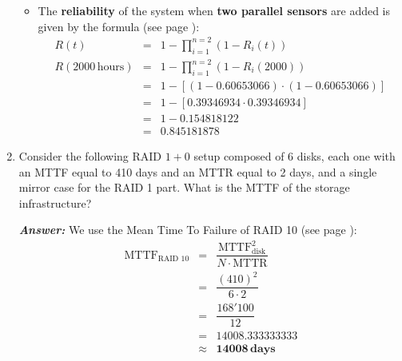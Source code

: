 \begin{enumerate}
\begin{itemize}
        \item The \textbf{reliability} of the system when \textbf{two parallel sensors} are added is given by the formula (see page \pageref{eq: system fails when the last component fails - parallel}):
        \begin{equation*}
            \begin{array}{rcl}
                R\left(t\right) &=& 1 - \displaystyle\prod_{i=1}^{n=2} \left(1 - R_{i}\left(t\right)\right) \\ [1.3em]
                R\left(2000 \, \text{hours}\right) &=& 1 - \displaystyle\prod_{i=1}^{n=2} \left(1 - R_{i}\left(2000\right)\right) \\ [1.3em]
                &=& 1 - \left[
                    \left(1 - 0.60653066\right)
                    \cdot
                    \left(1 - 0.60653066\right)
                \right] \\ [.5em]
                &=& 1 - \left[
                    0.39346934 \cdot 0.39346934
                \right] \\ [.5em]
                &=& 1 - 0.154818122 \\ [.5em]
                &=& \mathbf{0.8451}81878
            \end{array}
        \end{equation*}
    \end{itemize}

    \newpage

    \item Consider the following RAID $1+0$ setup composed of 6 disks, each one with an MTTF equal to 410 days and an MTTR equal to 2 days, and a single mirror case for the RAID 1 part. What is the MTTF of the storage infrastructure?

    \textcolor{Green3}{\textbf{\emph{Answer:}}} We use the Mean Time To Failure of RAID 10 (see page \pageref{eq: RAID 10 - MTTF}):
    \begin{equation*}
        \begin{array}{rcl}
            \text{MTTF}_{\text{RAID 10}} &=& \dfrac{\text{MTTF}_{\text{disk}}^{2}}{N \cdot \text{MTTR}} \\ [1.3em]
            &=& \dfrac{\left(410\right)^{2}}{6 \cdot 2} \\ [1.3em]
            &=& \dfrac{168'100}{12} \\ [1.3em]
            &=& 14008.333333333 \\ [.5em]
            &\approx& \mathbf{14008} \, \textbf{days}
        \end{array}
    \end{equation*}


\end{enumerate}

